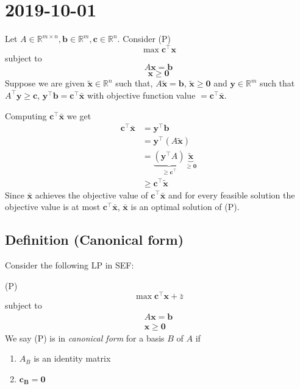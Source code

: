 \section{2019-10-01}
Let $A\in \mathbb{R}^{m\times n}, \bm{b}\in\mathbb{R}^m, \bm{c}\in\mathbb{R}^n$.
Consider (P)
\[\max \bm{c}^\top \bm{x}\]
subject to
\[ A\bm{x}=\bm{b} \]
\[ \bm{x}\ge\bm{0} \]
Suppose we are given
$\bm{\tilde{x}}\in\mathbb{R}^n$ such that, $A\bm{\tilde{x}}=\bm{b}$,
$\bm{\tilde{x}}\ge\bm{0}$
and
$\bm{y}\in\mathbb{R}^m$ such that $A^\top \bm{y}\ge\bm{c}$,
$\bm{y}^\top \bm{b}=\bm{c}^\top \bm{\bar{x}}$ with objective function
value $=\bm{c}^\top \bm{\bar{x}}$.


Computing $\bm{c}^\top \bm{\bar{x}}$ we get
\begin{align*}
    \bm{c}^\top \bm{\bar{x}}&=\bm{y}^\top \bm{b}\\
    &=\bm{y}^\top (A\bm{\tilde{x}})\\
    &=
    \underbrace{(\bm{y}^\top A)}_{\ge \bm{c}^\top }
    \underbrace{\bm{\tilde{x}}}_{\ge \bm{0}}\\
    &\ge \bm{c}^\top \bm{\tilde{x}}
\end{align*}
Since $\bm{\bar{x}}$ achieves the objective value of 
$\bm{c}^\top \bm{\bar{x}}$ and for every feasible solution the objective
value is at most $\bm{c}^\top \bm{\bar{x}}$, $\bm{\bar{x}}$ is an
optimal solution of (P).


\begin{defbox}
    \subsection{Definition (Canonical form)}
    Consider the following LP in SEF:

    (P)
    \[\max \bm{c}^\top  \bm{x}+\bar{z}\]
    subject to
    \begin{align*}
        A\bm{x}=\bm{b}\\
        \bm{x}\ge \bm{0}
    \end{align*}
    We say (P) is in \emph{canonical form} for a basis $B$ of $A$ if
    \begin{enumerate}[(C1)]
        \item $A_B$ is an identity matrix
        \item $\bm{c_B}=\bm{0}$
    \end{enumerate}
\end{defbox}

